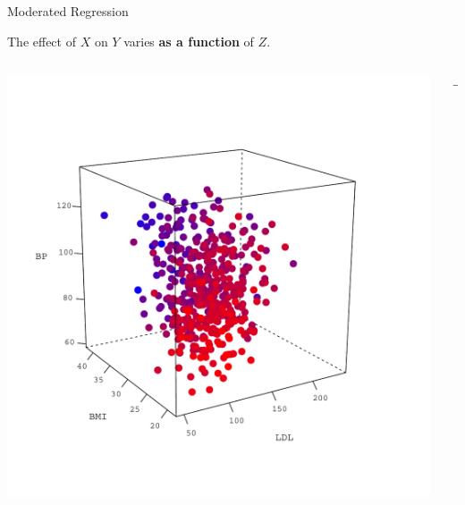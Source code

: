 \documentclass{beamer}\usepackage[]{graphicx}\usepackage[]{color}
\begin{document}
\begin{frame}{Moderated Regression}
  
  The effect of $X$ on $Y$ varies \textbf{as a function} of $Z$.
  
  \begin{columns}
    \begin{column}{0.45\textwidth}
      \includegraphics[width = 1.1\textwidth]{figures/3d_data_plot}
    \end{column}
    
    \begin{column}{0.1\textwidth}
      \begin{center}\Huge{$\rightarrow$}\end{center}
    \end{column}
    

\end{columns}
\end{frame}
\end{document}
